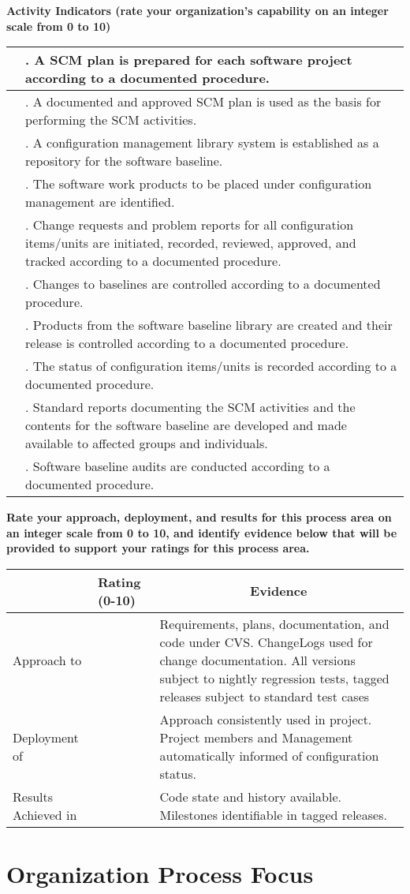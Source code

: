 \documentclass{article}
\newcommand{\KPAname}{}
\let\KPAsection=\section
\renewcommand{\section}[1]{\renewcommand{\KPAname}{#1}\KPAsection{#1}}
\newcounter{activity}[section]		%
\newcounter{approach}[section]
\newcounter{deployment}[section]
\newcounter{result}[section]
\newcounter{score}
\newenvironment{KPAActivity}
{
    {\bf Activity Indicators (rate your organization's capability
    on an integer scale from 0 to 10)} %
    \begin{center}
    \begin{tabular}{|p{0.5in}|p{6.0in}|} \hline %
}
{
    \end{tabular}
    \end{center}
    \setcounter{approach}{\value{approach}/\value{activity}}
    \setcounter{deployment}{\value{deployment}/\value{activity}}
    \setcounter{result}{\value{result}/\value{activity}}
}
\newcommand{\Activity}[4]
{
    \stepcounter{activity} 
    \setcounter{score}{(#1+#2+#3)/3}
    \setcounter{approach}{\value{approach}+#1}
    \setcounter{deployment}{\value{deployment}+#1}
    \setcounter{result}{\value{result}+#1}
    \arabic{score} & \arabic{activity}. #4 \\ \hline
} %
\newenvironment{KPARate}
{
    {\bf Rate your approach, deployment, and results for
    this process area on an integer scale from 0 to 10, and 
    identify evidence below that will be provided to support your
    ratings for this process area.}
    \begin{center}
    \begin{tabular}{|p{1.0in}|p{0.5in}|p{5.0in}|} \hline
    & Rating (0-10) & \multicolumn{1}{c|}{Evidence} \\ \hline
}
{
    \end{tabular}
    \end{center}
}
\newcommand{\Approach}[1]
{
    Approach to \KPAname & \arabic{approach} & #1 \\ \hline
}
\newcommand{\Deployment}[1]
{
    Deployment of \KPAname & \arabic{deployment} & #1 \\ \hline
}
\newcommand{\Results}[1]
{
    Results Achieved in \KPAname & \arabic{result} & #1 \\ \hline
}
\begin{document}
\begin{KPAActivity}
\Activity{4}{4}{4}{A SCM plan is prepared for each software project
according to a documented procedure.}
\Activity{4}{4}{4}{A documented and approved SCM plan is used as the basis
for performing the SCM activities.}
\Activity{6}{6}{6}{A configuration management library system is established
as a repository for the software baseline.}
\Activity{4}{4}{4}{The software work products to be placed under
configuration management are identified.}
\Activity{3}{3}{3}{Change requests and problem reports for all configuration
items/units are initiated, recorded, reviewed, approved, and tracked
according to a documented procedure.}
\Activity{2}{2}{2}{Changes to baselines are controlled according to a
documented procedure.}
\Activity{1}{1}{1}{Products from the software baseline library are created
and their release is controlled according to a documented procedure.}
\Activity{1}{1}{1}{The status of configuration items/units is recorded
according to a documented procedure.}
\Activity{5}{5}{5}{Standard reports documenting the SCM activities and the
contents for the software baseline are developed and made available to
affected groups and individuals.}
\Activity{1}{1}{1}{Software baseline audits are conducted according to a
documented procedure.}
\end{KPAActivity}

\begin{KPARate}
\Approach{Requirements, plans, documentation, and code under CVS.
             ChangeLogs used for change documentation.  All versions
             subject to nightly regression tests, tagged
             releases subject to standard test cases}
\Deployment{Approach consistently used in project. Project members
             and Management automatically informed of configuration
             status.}
\Results{Code state and history available.  Milestones identifiable
            in tagged releases.}
\end{KPARate}

\newpage
\section{Organization Process Focus}
\end{document}
